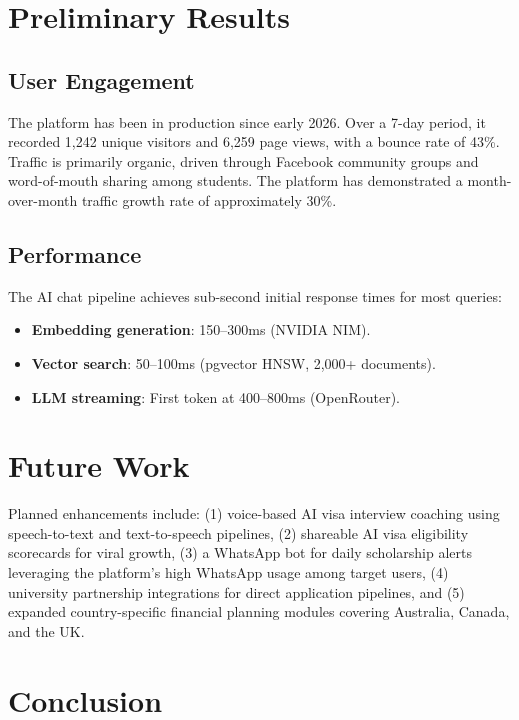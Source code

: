 \documentclass[conference]{IEEEtran}
\begin{document}
\section{Preliminary Results}
\label{sec:results}

\subsection{User Engagement}

The platform has been in production since early 2026. Over a 7-day period, it recorded 1,242 unique visitors and 6,259 page views, with a bounce rate of 43\%. Traffic is primarily organic, driven through Facebook community groups and word-of-mouth sharing among students. The platform has demonstrated a month-over-month traffic growth rate of approximately 30\%.

\subsection{Performance}

The AI chat pipeline achieves sub-second initial response times for most queries:

\begin{itemize}
    \item \textbf{Embedding generation}: 150--300ms (NVIDIA NIM).
    \item \textbf{Vector search}: 50--100ms (pgvector HNSW, 2,000+ documents).
    \item \textbf{LLM streaming}: First token at 400--800ms (OpenRouter).
\end{itemize}

\section{Future Work}
\label{sec:future}

Planned enhancements include: (1) voice-based AI visa interview coaching using speech-to-text and text-to-speech pipelines, (2) shareable AI visa eligibility scorecards for viral growth, (3) a WhatsApp bot for daily scholarship alerts leveraging the platform's high WhatsApp usage among target users, (4) university partnership integrations for direct application pipelines, and (5) expanded country-specific financial planning modules covering Australia, Canada, and the UK.

\section{Conclusion}
\label{sec:conclusion}
\end{document}
